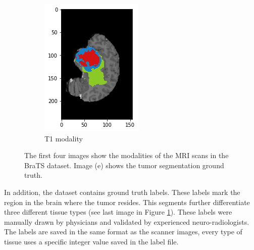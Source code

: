 \begin{figure}[H]
\begin{subfigure}{.2\textwidth}
        \includegraphics[width=\linewidth]{chapters/04_segmentation/images/brats/4.png}
        \caption{T1 modality}
    \end{subfigure}
    \caption{The first four images show the modalities of the MRI scans in the BraTS dataset. Image (e) shows the tumor segmentation ground truth.}
    \label{brats_example}
\end{figure}

In addition, the dataset contains ground truth labels. These labels mark the region in the brain where the tumor resides.
This segments further differentiate three different tissue types (see last image in Figure \ref{brats_example}).
These labels were manually drawn by physicians and validated by experienced neuro-radiologists.
The labels are saved in the same format as the scanner images, every type of tissue uses a specific integer value saved in the label file.
